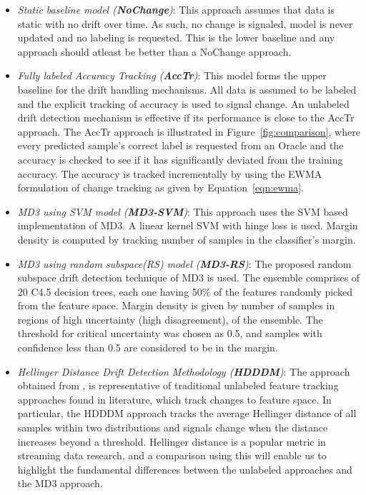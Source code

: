 \documentclass[authoryear,3p,times,twocolumn]{elsarticle}
\begin{document}
\begin{itemize}
\item \textit{Static baseline model (\textbf{NoChange})}: This approach assumes that data is static with no drift over time. As such, no change is signaled, model is never updated and no labeling is requested. This is the lower baseline and any approach should atleast be better than a NoChange approach.

\item \textit{Fully labeled Accuracy Tracking (\textbf{AccTr})}: This model forms the upper baseline for the drift handling mechanisms. All data is assumed to be labeled and the explicit tracking of accuracy is used to signal change. An unlabeled drift detection mechanism is effective if its performance is close to the AccTr approach. The AccTr approach is illustrated in Figure~\ref{fig:comparison}, where every predicted sample's correct label is requested from an Oracle and the accuracy is checked to see if it has significantly deviated from the training accuracy. The accuracy is tracked incrementally by using the EWMA \citep{ross2012exponentially} formulation of change tracking as given by Equation~\ref{eqn:ewma}. 

\item\textit{MD3 using SVM model (\textbf{MD3-SVM})}: This approach uses the SVM based implementation of MD3. A linear kernel SVM with hinge loss is used. Margin density is computed by tracking number of samples in the classifier's margin. 

\item\textit{MD3 using random subspace(RS) model (\textbf{MD3-RS})}: The proposed random subspace drift detection technique of MD3 is used. The ensemble comprises of 20 C4.5 decision trees, each one having 50\% of the features randomly picked from the feature space. Margin density is given by number of samples in regions of high uncertainty (high disagreement), of the ensemble. The threshold for critical uncertainty was chosen as 0.5, and samples with confidence less than 0.5 are considered to be in the margin. 

\item\textit{Hellinger Distance Drift Detection Methodology (\textbf{HDDDM})}: The approach obtained from   \citep{ditzler2011hellinger}, is representative of traditional unlabeled feature tracking approaches found in literature, which track changes to feature space. In particular, the HDDDM approach tracks the average Hellinger distance of all samples within two distributions and signals change when the distance increases beyond a threshold. Hellinger distance is a popular metric in streaming data research, and a comparison using this will enable us to highlight the fundamental differences between the unlabeled approaches and the MD3 approach.
\end{itemize}
\end{document}
